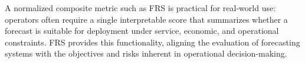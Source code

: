 A normalized composite metric such as FRS is practical for real-world use:
operators often require a single interpretable score that summarizes whether a
forecast is suitable for deployment under service, economic, and operational
constraints. FRS provides this functionality, aligning the evaluation of
forecasting systems with the objectives and risks inherent in operational
decision-making.
